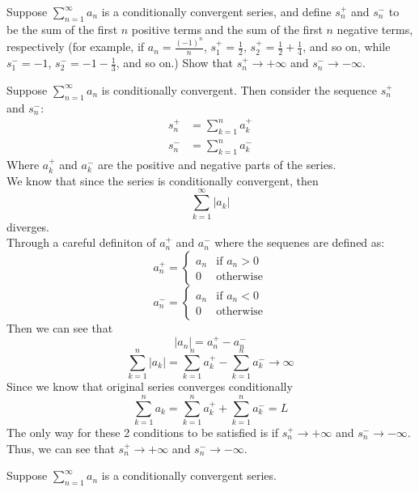 \documentclass[answers,12pt,addpoints]{exam}
\begin{document}
\begin{questions}
        \question Suppose \(\sum_{n=1}^{\infty} a_n\) is a conditionally convergent series, and define \(s_n^+\) and \(s_n^-\) to be the sum of the first \(n\) positive terms and the sum of the first \(n\) negative terms, respectively (for example, if \(a_n = \frac{(-1)^n}{n}\), \(s_1^+ = \frac{1}{2}\), \(s_2^+ = \frac{1}{2} + \frac{1}{4}\), and so on, while \(s_1^- = -1\), \(s_2^- = -1 - \frac{1}{3}\), and so on.) Show that \(s_n^+ \to +\infty\) and \(s_n^- \to -\infty\).
        \begin{solution}
            Suppose $\sum_{n=1}^{\infty} a_n$ is conditionally convergent. Then consider the sequence $s_n^+$ and $s_n^-$:
            \begin{align*}
                s_n^+ &= \sum_{k=1}^{n} a_k^+ \\
                s_n^- &= \sum_{k=1}^{n} a_k^-
            \end{align*}
            Where $a_k^+$ and $a_k^-$ are the positive and negative parts of the series. \\
            We know that since the series is conditionally convergent, then $$\sum_{k=1}^{\infty} |a_k|$$ diverges. \\
            Through a careful definiton of $a_n^+$ and $a_n^-$ where the sequenes are defined as:
            $$ a_n^+ = \begin{cases}
                a_n & \text{if } a_n > 0 \\
                0 & \text{otherwise}
            \end{cases} $$
            $$ a_n^- = \begin{cases}
                a_n & \text{if } a_n < 0 \\
                0 & \text{otherwise}
            \end{cases} $$
            Then we can see that 
            $$ |a_n| = a_n^+ - a_n^- $$
            $$ \sum_{k=1}^{n} |a_k| = \sum_{k=1}^{n} a_k^+ - \sum_{k=1}^{n} a_k^- \to \infty $$
            Since we know that original series converges conditionally
            $$ \sum_{k=1}^{n} a_k = \sum_{k=1}^{n} a_k^+ + \sum_{k=1}^{n} a_k^- = L $$
            The only way for these 2 conditions to be satisfied is if $s_n^+ \to +\infty$ and $s_n^- \to -\infty$.
            Thus, we can see that $s_n^+ \to +\infty$ and $s_n^- \to -\infty$.
        \end{solution}

        \question Suppose \(\sum_{n=1}^{\infty} a_n\) is a conditionally convergent series.
        \begin{parts}

\end{parts}
\end{questions}
\end{document}
